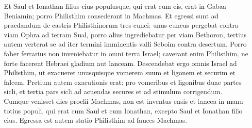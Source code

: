 \begin{biblechapter}
\begin{biblechapter}
\begin{biblechapter}
\begin{biblechapter}
\begin{biblechapter}
\begin{biblechapter}
\begin{biblechapter}
\begin{biblechapter}
\begin{biblechapter}
\begin{biblechapter}
\begin{biblechapter}
\begin{biblechapter}
\begin{biblechapter}
 \verse Et Saul et Ionathan filius eius populusque, qui erat cum eis, erat in Gabaa Beniamin; porro Philisthim consederant in Machmas. 
\verse Et egressi sunt ad praedandum de castris Philisthinorum tres cunei: unus cuneus pergebat contra viam Ophra ad terram Sual, 
\verse porro alius ingrediebatur per viam Bethoron, tertius autem verterat se ad iter termini imminentis valli Seboim contra desertum.
 \verse Porro faber ferrarius non inveniebatur in omni terra Israel; caverant enim Philisthim, ne forte facerent Hebraei gladium aut lanceam. 
\verse Descendebat ergo omnis Israel ad Philisthim, ut exacueret unusquisque vomerem suum et ligonem et securim et falcem. 
\verse Pretium autem exacutionis erat: pro vomeribus et ligonibus duae partes sicli, et tertia pars sicli ad acuendas secures et ad stimulum corrigendum. 
\verse Cumque venisset dies proelii Machmas, non est inventus ensis et lancea in manu totius populi, qui erat cum Saul et cum Ionathan, excepto Saul et Ionathan filio eius.
 \verse Egressa est autem statio Philisthim ad fauces Machmas.
 

\end{biblechapter}
\end{biblechapter}
\end{biblechapter}
\end{biblechapter}
\end{biblechapter}
\end{biblechapter}
\end{biblechapter}
\end{biblechapter}
\end{biblechapter}
\end{biblechapter}
\end{biblechapter}
\end{biblechapter}
\end{biblechapter}
